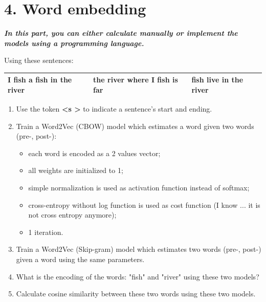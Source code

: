 \documentclass{../extra/aakpract/aakpract}
\begin{document}
\section*{4. Word embedding}

\textbf{\textit{In this part, you can either calculate manually or implement the models using a programming language.}}

\noindent Using these sentences:
\begin{center}
	\begin{tabular}{|lll|}
		\hline 
		I fish a fish in the river & the river where I fish is far & fish live in the river\\
		\hline
	\end{tabular}
\end{center}

\begin{enumerate}
	\item Use the token \textbf{\textless s \textgreater} to indicate a sentence's start and ending.
	\item Train a Word2Vec (CBOW) model which estimates a word given two words (pre-, post-):
	\begin{itemize}
		\item each word is encoded as a 2 values vector;
		\item all weights are initialized to 1;
		\item simple normalization is used as activation function instead of softmax;
		\item cross-entropy without log function is used as cost function (I know ... it is not cross entropy anymore);
		\item 1 iteration.
	\end{itemize}
	
	\item Train a Word2Vec (Skip-gram) model which estimates two words (pre-, post-) given a word using the same parameters.
	
	\item What is the encoding of the words: "fish" and "river" using these two models?
	\item Calculate cosine similarity between these two words using these two models. 
	

\end{enumerate}
\end{document}
